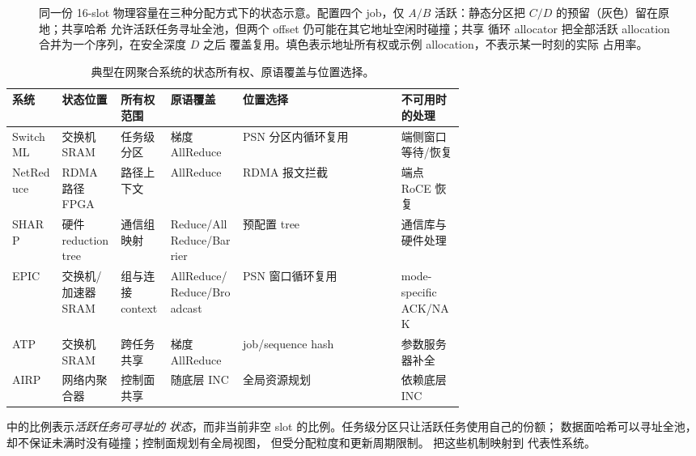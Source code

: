 \begin{figure}[t]
\centering

\caption{同一份 16-slot 物理容量在三种分配方式下的状态示意。配置四个
job，仅 $A/B$ 活跃：静态分区把 $C/D$ 的预留（灰色）留在原地；共享哈希
允许活跃任务寻址全池，但两个 offset 仍可能在其它地址空闲时碰撞；共享
循环 allocator 把全部活跃 allocation 合并为一个序列，在安全深度 $D$ 之后
覆盖复用。填色表示地址所有权或示例 allocation，不表示某一时刻的实际
占用率。}
\label{fig:motivation-state-allocation}
\end{figure}

\begin{table}[t]
    \centering
    \caption{典型在网聚合系统的状态所有权、原语覆盖与位置选择。}
    \label{tab:inc-comparison}
    \small
    \setlength{\tabcolsep}{3pt}
    \begin{tabularx}{\linewidth}{@{}p{0.11\linewidth}p{0.13\linewidth}p{0.11\linewidth}p{0.16\linewidth}Xp{0.14\linewidth}@{}}
        \toprule
        系统 & 状态位置 & 所有权范围 & 原语覆盖 & 位置选择 & 不可用时的处理 \\
        \midrule
        SwitchML~\cite{switchml} & 交换机 SRAM & 任务级分区 & 梯度 AllReduce & PSN 分区内循环复用 & 端侧窗口等待/恢复 \\
        NetReduce~\cite{netreduce} & RDMA 路径 FPGA & 路径上下文 & AllReduce & RDMA 报文拦截 & 端点 RoCE 恢复 \\
        SHARP~\cite{sharp} & 硬件 reduction tree & 通信组映射 & Reduce/AllReduce/Barrier & 预配置 tree & 通信库与硬件处理 \\
        EPIC~\cite{epic} & 交换机/加速器 SRAM & 组与连接 context & AllReduce/Reduce/Broadcast & PSN 窗口循环复用 & mode-specific ACK/NAK \\
        ATP~\cite{atp} & 交换机 SRAM & 跨任务共享 & 梯度 AllReduce & job/sequence hash & 参数服务器补全 \\
        AIRP~\cite{airp} & 网络内聚合器 & 控制面共享 & 随底层 INC & 全局资源规划 & 依赖底层 INC \\
        \bottomrule
    \end{tabularx}
\end{table}

 中的比例表示\emph{活跃任务可寻址的
状态}，而非当前非空 slot 的比例。任务级分区只让活跃任务使用自己的份额；
数据面哈希可以寻址全池，却不保证未满时没有碰撞；控制面规划有全局视图，
但受分配粒度和更新周期限制。 把这些机制映射到
代表性系统。

